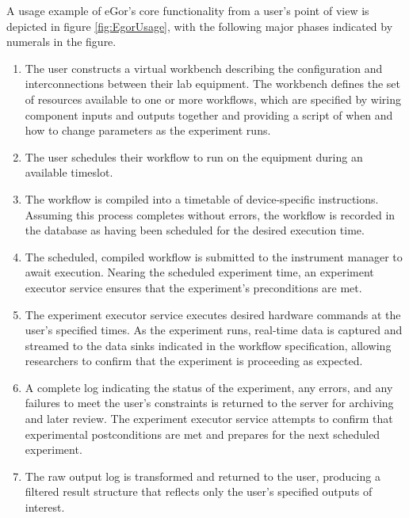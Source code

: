 \documentclass[../thesis]{subfiles}
\begin{document}
A usage example of eGor's core functionality from a user's point of
view is depicted in figure \ref{fig:EgorUsage}, with the following
major phases indicated by numerals in the figure.
\begin{enumerate}
  \item{
      The user constructs a virtual workbench describing the
      configuration and interconnections between their lab
      equipment. The workbench defines the set of resources available
      to one or more workflows, which are specified by wiring
      component inputs and outputs together and providing a script of
      when and how to change parameters as the experiment runs.
  }
  \item{
      The user schedules their workflow to run on the equipment during
      an available timeslot.
  }
  \item{
      The workflow is compiled into a timetable of device-specific
      instructions. Assuming this process completes without errors,
      the workflow is recorded in the database as having been
      scheduled for the desired execution time.
  }
  \item{
      The scheduled, compiled workflow is submitted to the instrument
      manager to await execution. Nearing the scheduled experiment
      time, an experiment executor service ensures that the experiment's
      preconditions are met.
  }
  \item{
      The experiment executor service executes desired hardware
      commands at the user's specified times. As the experiment runs,
      real-time data is captured and streamed to the data sinks
      indicated in the workflow specification, allowing researchers to
      confirm that the experiment is proceeding as expected.
  }
  \item{
      A complete log indicating the status of the experiment, any
      errors, and any failures to meet the user's constraints is
      returned to the server for archiving and later review. The
      experiment executor service attempts to confirm that experimental
      postconditions are met and prepares for the next scheduled
      experiment.
  }
  \item{
      The raw output log is transformed and returned to the user,
      producing a filtered result structure that reflects only the
      user's specified outputs of interest.
  }
\end{enumerate}
\end{document}
